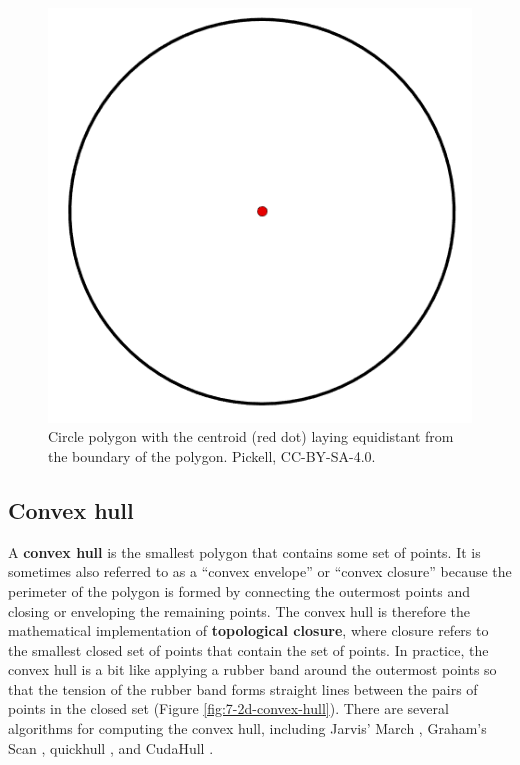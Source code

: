 \documentclass[
]{book}
\begin{document}
\begin{figure}
\includegraphics[width=0.5\linewidth]{images/07-circle-polygon-centroid} \caption{Circle polygon with the centroid (red dot) laying equidistant from the boundary of the polygon. Pickell, CC-BY-SA-4.0.}\label{fig:7-circle-polygon-centroid}
\end{figure}

\subsection{Convex hull}\label{convex-hull}

A \textbf{convex hull} is the smallest polygon that contains some set of points. It is sometimes also referred to as a ``convex envelope'' or ``convex closure'' because the perimeter of the polygon is formed by connecting the outermost points and closing or enveloping the remaining points. The convex hull is therefore the mathematical implementation of \textbf{topological closure}, where closure refers to the smallest closed set of points that contain the set of points. In practice, the convex hull is a bit like applying a rubber band around the outermost points so that the tension of the rubber band forms straight lines between the pairs of points in the closed set (Figure \ref{fig:7-2d-convex-hull}). There are several algorithms for computing the convex hull, including Jarvis' March \citep{jarvis_identification_1973}, Graham's Scan \citep{graham_efficient_1972}, quickhull \citep{barber_quickhull_1996}, and CudaHull \citep{stein_cudahull_2012}.
\end{document}
